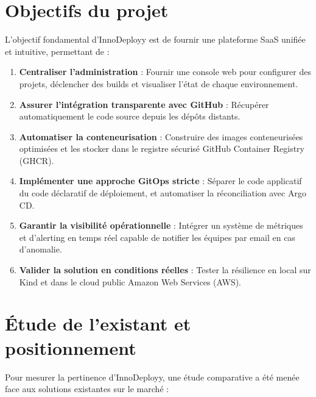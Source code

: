 \documentclass[12pt,a4paper,oneside]{report}
\begin{document}
\section{Objectifs du projet}
L'objectif fondamental d'InnoDeployy est de fournir une plateforme SaaS unifiée et intuitive, permettant de :
\begin{enumerate}
    \item \textbf{Centraliser l'administration} : Fournir une console web pour configurer des projets, déclencher des builds et visualiser l'état de chaque environnement.
    \item \textbf{Assurer l'intégration transparente avec GitHub} : Récupérer automatiquement le code source depuis les dépôts distants.
    \item \textbf{Automatiser la conteneurisation} : Construire des images conteneurisées optimisées et les stocker dans le registre sécurisé GitHub Container Registry (GHCR).
    \item \textbf{Implémenter une approche GitOps stricte} : Séparer le code applicatif du code déclaratif de déploiement, et automatiser la réconciliation avec Argo CD.
    \item \textbf{Garantir la visibilité opérationnelle} : Intégrer un système de métriques et d'alerting en temps réel capable de notifier les équipes par email en cas d'anomalie.
    \item \textbf{Valider la solution en conditions réelles} : Tester la résilience en local sur Kind et dans le cloud public Amazon Web Services (AWS).
\end{enumerate}

\section{Étude de l'existant et positionnement}
Pour mesurer la pertinence d'InnoDeployy, une étude comparative a été menée face aux solutions existantes sur le marché :
\end{document}
